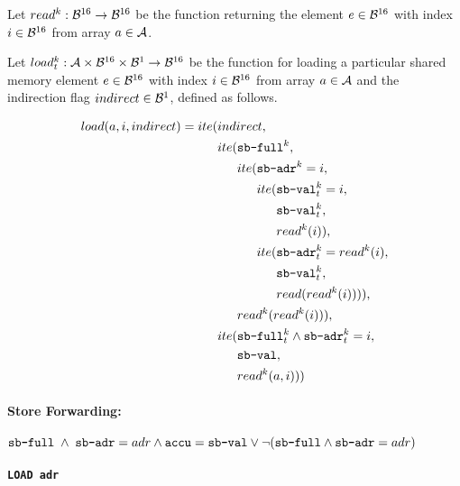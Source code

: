 Let $read^k: \bvsort \to \bvsort$ be the function returning the element $e \in \bvsort$ with index $i \in \bvsort$ from array $a \in \asort$.

Let $load^k_t: \asort \times \bvsort \times \bvsort[1] \to \bvsort$ be the function for loading a particular shared memory element $e \in \bvsort$ with index $i \in \bvsort$ from array $a \in \asort$ and the indirection flag $indirect \in \bvsort[1]$, defined as follows.

\begin{align}
  load(a, i, indirect) = ite( & indirect, \\
                              & ite(\sbfull^k, \\
                              & \;\;\;\;\;\, ite(\sbadr^k = i, \\
                              & \;\;\;\;\;\, \;\;\;\;\;\, ite(\sbval^k_t = i, \\
                              & \;\;\;\;\;\, \;\;\;\;\;\, \;\;\;\;\;\, \sbval^k_t, \\
                              & \;\;\;\;\;\, \;\;\;\;\;\, \;\;\;\;\;\, read^k(i)), \\
                              & \;\;\;\;\;\, \;\;\;\;\;\, ite(\sbadr^k_t = read^k(i), \\
                              & \;\;\;\;\;\, \;\;\;\;\;\, \;\;\;\;\;\, \sbval^k_t, \\
                              & \;\;\;\;\;\, \;\;\;\;\;\, \;\;\;\;\;\, read(read^k(i)))), \\
                              & \;\;\;\;\;\, read^k(read^k(i))), \\
                              & ite(\sbfull^k_t \land \sbadr^k_t = i, \\
                              & \;\;\;\;\;\, \sbval, \\
                              & \;\;\;\;\;\, read^k(a, i)))
\end{align}

\paragraph{Store Forwarding:} $\sbfull \; \land \; \sbadr = adr \land \accu = \sbval \lor \lnot (\sbfull \land \sbadr = adr)$


\paragraph{\texttt{LOAD adr}}

